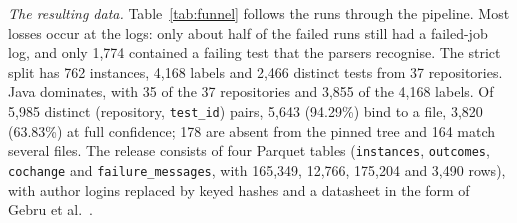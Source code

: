 \documentclass[10pt,conference]{IEEEtran}
\begin{document}
\begin{table}[t]
\caption{Attrition of Runs and the Resulting Splits}
\label{tab:funnel}
\centering
\scriptsize
\setlength{\tabcolsep}{3pt}
\end{table}

\textit{The resulting data.} Table~\ref{tab:funnel} follows the runs through the pipeline. Most losses occur at the logs: only about half of the failed runs still had a failed-job log, and only 1,774 contained a failing test that the parsers recognise. The strict split has 762 instances, 4,168 labels and 2,466 distinct tests from 37 repositories. Java dominates, with 35 of the 37 repositories and 3,855 of the 4,168 labels. Of 5,985 distinct (repository, \texttt{test\_id}) pairs, 5,643 (94.29\%) bind to a file, 3,820 (63.83\%) at full confidence; 178 are absent from the pinned tree and 164 match several files. The release consists of four Parquet tables (\texttt{instances}, \texttt{outcomes}, \texttt{cochange} and \texttt{failure\_messages}, with 165,349, 12,766, 175,204 and 3,490 rows), with author logins replaced by keyed hashes and a datasheet in the form of Gebru et al.~\cite{gebru2021datasheets}.
\end{document}
